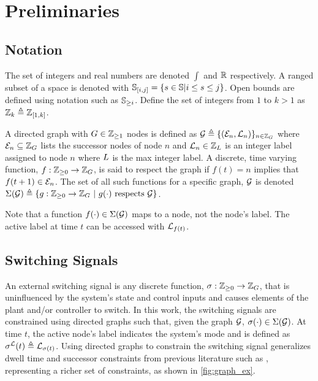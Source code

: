 \section{Preliminaries}
\subsection{Notation}
The set of integers and real numbers are denoted $\int$ and $\mathbb{R}$ respectively. A ranged subset of a space is denoted with $\mathbb{S}_{[i,j]}=\{s\in\mathbb{S}|i\leq s\leq j\}$. Open bounds are defined using notation such as $\mathbb{S}_{\geq i}$. Define the set of integers from $1$ to $k>1$ as $\mathbb{Z}_{k}\triangleq\mathbb{Z}_{[1,k]}$.

A directed graph with $\gnumnodes\in\int\rgeq{1}$ nodes is defined as $\graph\triangleq\{(\gnodeedges{n},\gnodelabel{n})\}_{n\in\idxset{\gnumnodes}}$ where $\gnodeedges{n}\subseteq\idxset{\gnumnodes}$ lists the successor nodes of node $n$ and $\mathcal{L}_{n}\in\mathbb{Z}_{L}$ is an integer label assigned to node $n$ where $L$ is the max integer label. A discrete, time varying function, $f:\int\rgeq{0}\rightarrow\idxset{\gnumnodes}$, is said to respect the graph if $f(t)=n$ implies that $f(t+1)\in\gnodeedges{n}$. The set of all such functions for a specific graph, $\mathcal{G}$ is denoted $\Sigma(\mathcal{G})\triangleq\{g:\int\rgeq{0}\rightarrow\idxset{\gnumnodes}\ |\ g(\cdot)\text{ respects }\graph\}$. 
\begin{remark}
Note that a function $f(\cdot)\in\Sigma(\mathcal{G})$ maps to a node, not the node's label. The active label at time $t$ can be accessed with $\mathcal{L}_{f(t)}$. 
\end{remark}

\subsection{Switching Signals}
An external switching signal is any discrete function, $\ss:\int\rgeq{0}\rightarrow \idxset{\gnumnodes}$, that is uninfluenced by the system's state and control inputs and causes elements of the plant and/or controller to switch. In this work, the switching signals are constrained using directed graphs such that, given the graph $\mathcal{G}$, ${\sigma}(\cdot)\in\Sigma(\mathcal{G})$. At time $t$, the active node's label indicates the system's mode and is defined as $\ssl(t)\triangleq \gnodelabel{\ss(t)}$. Using directed graphs to constrain the switching signal generalizes dwell time and successor constraints from previous literature such as \cite{Danielson2019, Hall2022, Zhang2016}, representing a richer set of constraints, as shown in \autoref{fig:graph_ex}.


